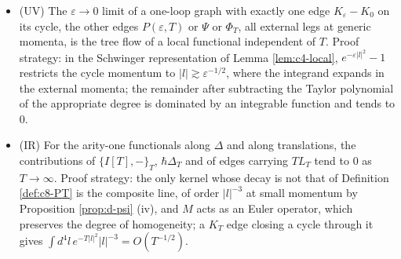\begin{axiom}
\label{ax:d-loc}
\begin{itemize}
\item (UV) The $\varepsilon\to0$ limit of a one-loop graph with exactly one edge $K_\varepsilon-K_0$ on its cycle, the other edges $P(\varepsilon,T)$ or $\Psi$ or $\Phi_T$, all external legs at generic momenta, is the tree flow of a local functional independent of $T$. Proof strategy: in the Schwinger representation of Lemma \ref{lem:c4-local}, $e^{-\varepsilon|l|^2}-1$ restricts the cycle momentum to $|l|\gtrsim\varepsilon^{-1/2}$, where the integrand expands in the external momenta; the remainder after subtracting the Taylor polynomial of the appropriate degree is dominated by an integrable function and tends to $0$.
\item (IR) For the arity-one functionals along $\Delta$ and along translations, the contributions of $\{I[T],-\}_T$, $\hbar\Delta_T$ and of edges carrying $TL_T$ tend to $0$ as $T\to\infty$. Proof strategy: the only kernel whose decay is not that of Definition \ref{def:c8-PT} is the composite line, of order $|l|^{-3}$ at small momentum by Proposition \ref{prop:d-psi} (iv), and $M$ acts as an Euler operator, which preserves the degree of homogeneity; a $K_T$ edge closing a cycle through it gives $\int d^4l\,e^{-T|l|^2}|l|^{-3}=O(T^{-1/2})$.
\end{itemize}
\end{axiom}

